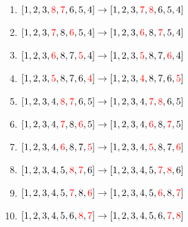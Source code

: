 \documentclass{article}
\begin{document}
\begin{solution}
\begin{enumerate}[nosep]
        \item $[1,2,3,{\color{red}8},{\color{red}7},6,5,4]\rightarrow [1,2,3,{\color{red}7},{\color{red}8},6,5,4]$
        \item $[1,2,3,{\color{red}7},8,{\color{red}6},5,4]\rightarrow [1,2,3,{\color{red}6},8,{\color{red}7},5,4]$
        \item $[1,2,3,{\color{red}6},8,7,{\color{red}5},4]\rightarrow [1,2,3,{\color{red}5},8,7,{\color{red}6},4]$
        \item $[1,2,3,{\color{red}5},8,7,6,{\color{red}4}]\rightarrow [1,2,3,{\color{red}4},8,7,6,{\color{red}5}]$
        \item $[1,2,3,4,{\color{red}8},{\color{red}7},6,5]\rightarrow [1,2,3,4,{\color{red}7},{\color{red}8},6,5]$
        \item $[1,2,3,4,{\color{red}7},8,{\color{red}6},5]\rightarrow [1,2,3,4,{\color{red}6},8,{\color{red}7},5]$
        \item $[1,2,3,4,{\color{red}6},8,7,{\color{red}5}]\rightarrow [1,2,3,4,{\color{red}5},8,7,{\color{red}6}]$
        \item $[1,2,3,4,5,{\color{red}8},{\color{red}7},6]\rightarrow [1,2,3,4,5,{\color{red}7},{\color{red}8},6]$
        \item $[1,2,3,4,5,{\color{red}7},8,{\color{red}6}]\rightarrow [1,2,3,4,5,{\color{red}6},8,{\color{red}7}]$
        \item $[1,2,3,4,5,6,{\color{red}8},{\color{red}7}]\rightarrow [1,2,3,4,5,6,{\color{red}7},{\color{red}8}]$
    \end{enumerate}


\end{solution}
\end{document}
